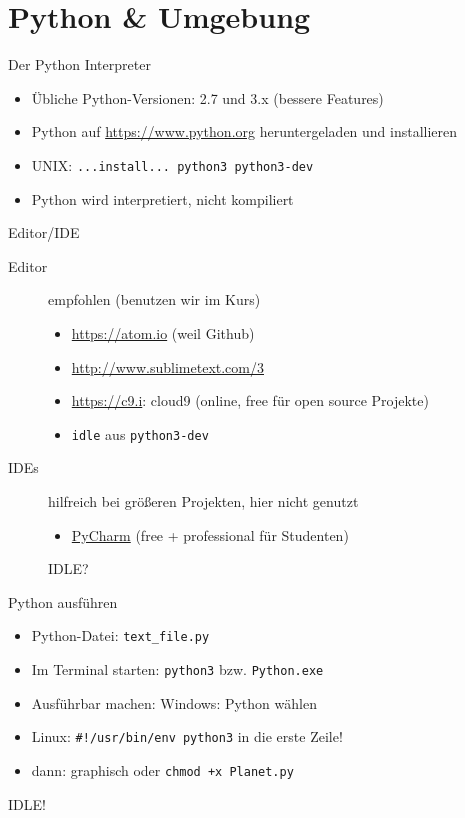 \section{Python \& Umgebung}
\begin{frame}{Der Python Interpreter}
	\begin{itemize}
		\item Übliche Python-Versionen: 2.7 und 3.x (bessere Features)
		\item Python auf \url{https://www.python.org} heruntergeladen und installieren
		\item UNIX: \texttt{...install... python3 python3-dev}
		\item<2-> Python wird interpretiert, nicht kompiliert
	\end{itemize}
\end{frame}
\begin{frame}{Editor/IDE}
	\begin{description}
		\item[Editor] empfohlen (benutzen wir im Kurs)
		\begin{itemize}
			\item \url{https://atom.io} (weil Github)
			\item \url{http://www.sublimetext.com/3}
			\item \url{https://c9.i}: cloud9 (online, free für open source Projekte)
			\item \texttt{idle} aus \texttt{python3-dev}
		\end{itemize}
		\item[IDEs] hilfreich bei größeren Projekten, hier nicht genutzt
		\begin{itemize}
			\item \href{https://jetbrains.com/pycharm}{PyCharm} (free + professional für Studenten)
		\end{itemize}
		
		IDLE?
	\end{description}
\end{frame}
\begin{frame}{Python ausführen}
	\begin{itemize}
		\item Python-Datei: \texttt{text\_file.py}
		\item Im Terminal starten: \texttt{python3} bzw. \texttt{Python.exe}
		\item Ausführbar machen: Windows: Python wählen
		\item Linux: \texttt{\#!/usr/bin/env python3} in die erste Zeile!
		\item dann: graphisch oder \texttt{chmod +x Planet.py}
	\end{itemize}
	
	IDLE!
\end{frame}

